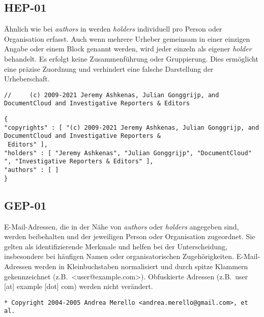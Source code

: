 
\subsection{HEP-01}\label{subsec:hep-01}

Ähnlich wie bei \textit{authors} in  werden \textit{holders} individuell pro Person oder Organisation erfasst.
Auch wenn mehrere Urheber gemeinsam in einer einzigen Angabe oder einem Block genannt werden, wird jeder einzeln als eigener \textit{holder} behandelt.
Es erfolgt keine Zusammenführung oder Gruppierung.
Dies ermöglicht eine präzise Zuordnung und verhindert eine falsche Darstellung der Urheberschaft.

\begin{lstlisting}[numbers=none, keepspaces=true]
//     (c) 2009-2021 Jeremy Ashkenas, Julian Gonggrijp, and DocumentCloud and Investigative Reporters & Editors
\end{lstlisting}

\begin{lstlisting}[numbers=none, keepspaces=true]
{
"copyrights" : [ "(c) 2009-2021 Jeremy Ashkenas, Julian Gonggrijp, and DocumentCloud and Investigative Reporters &
 Editors" ],
"holders" : [ "Jeremy Ashkenas", "Julian Gonggrijp", "DocumentCloud" ", "Investigative Reporters & Editors" ],
"authors" : [ ]
}
\end{lstlisting}


\subsection{GEP-01}\label{subsec:gep-01}

E-Mail-Adressen, die in der Nähe von \textit{authors} oder \textit{holders} angegeben sind, werden beibehalten und der jeweiligen Person oder Organisation zugeordnet.
Sie gelten als identifizierende Merkmale und helfen bei der Unterscheidung, insbesondere bei häufigen Namen oder organisatorischen Zugehörigkeiten.
E-Mail-Adressen werden in Kleinbuchstaben normalisiert und durch spitze Klammern gekennzeichnet (z.B.\ <user@example.com>).
Obfuskierte Adressen (z.B.\ user [at] example [dot] com) werden nicht verändert.

\begin{lstlisting}[numbers=none, keepspaces=true]
* Copyright 2004-2005 Andrea Merello <andrea.merello@gmail.com>, et al.
\end{lstlisting}


